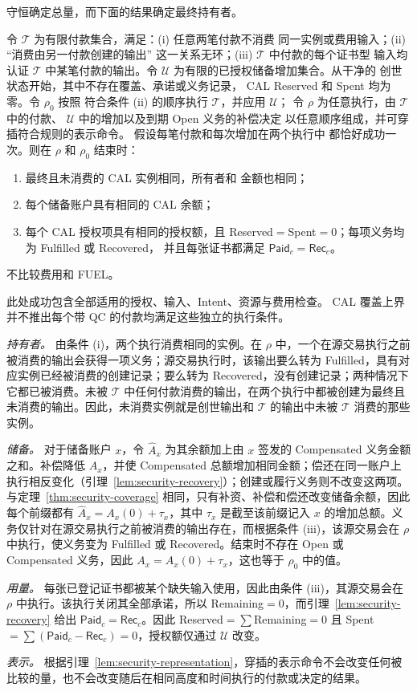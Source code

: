 守恒确定总量，而下面的结果确定最终持有者。

\begin{theorem}
\label{thm:security-neutrality}
令 $\mathcal T$ 为有限付款集合，满足：(i) 任意两笔付款不消费
同一实例或费用输入；(ii) ``消费由另一付款创建的输出''
这一关系无环；(iii) $\mathcal T$ 中付款的每个证书型
输入均认证 $\mathcal T$ 中某笔付款的输出。令
$\mathcal U$ 为有限的已授权储备增加集合。从干净的
创世状态开始，其中不存在覆盖、承诺或义务记录，
CAL Reserved 和 Spent 均为零。令 $\rho_0$ 按照
符合条件 (ii) 的顺序执行 $\mathcal T$，并应用 $\mathcal U$；
令 $\rho$ 为任意执行，由 $\mathcal T$ 中的付款、
$\mathcal U$ 中的增加以及到期 Open 义务的补偿决定
以任意顺序组成，并可穿插符合规则的表示命令。
假设每笔付款和每次增加在两个执行中
都恰好成功一次。则在 $\rho$ 和 $\rho_0$ 结束时：
\begin{enumerate}
\item 最终且未消费的 CAL 实例相同，所有者和
金额也相同；
\item 每个储备账户具有相同的 CAL 余额；
\item 每个 CAL 授权项具有相同的授权额，且
Reserved$=$Spent$=0$；每项义务均为 Fulfilled 或 Recovered，
并且每张证书都满足 $\mathsf{Paid}_c=\mathsf{Rec}_c$。
\end{enumerate}
不比较费用和 FUEL。
\end{theorem}
此处成功包含全部适用的授权、输入、Intent、资源与费用检查。
CAL 覆盖上界并不推出每个带 QC 的付款均满足这些独立的执行条件。
\begin{IEEEproof}
\emph{持有者。} 由条件 (i)，两个执行消费相同的实例。在 $\rho$ 中，一个在源交易执行之前被消费的输出会获得一项义务；源交易执行时，该输出要么转为 Fulfilled，具有对应实例已经被消费的创建记录；要么转为 Recovered，没有创建记录；两种情况下它都已被消费。未被 $\mathcal T$ 中任何付款消费的输出，在两个执行中都被创建为最终且未消费的输出。因此，未消费实例就是创世输出和 $\mathcal T$ 的输出中未被 $\mathcal T$ 消费的那些实例。

\emph{储备。} 对于储备账户 $x$，令 $\hat A_x$ 为其余额加上由 $x$ 签发的 Compensated 义务金额之和。补偿降低 $A_x$，并使 Compensated 总额增加相同金额；偿还在同一账户上执行相反变化（引理~\ref{lem:security-recovery}）；创建或履行义务则不改变这两项。与定理~\ref{thm:security-coverage} 相同，只有补资、补偿和偿还改变储备余额，因此每个前缀都有 $\hat A_x=A_x(0)+\tau_x$，其中 $\tau_x$ 是截至该前缀记入 $x$ 的增加总额。义务仅针对在源交易执行之前被消费的输出存在，而根据条件 (iii)，该源交易会在 $\rho$ 中执行，使义务变为 Fulfilled 或 Recovered。结束时不存在 Open 或 Compensated 义务，因此 $A_x=A_x(0)+\tau_x$，这也等于 $\rho_0$ 中的值。

\emph{用量。} 每张已登记证书都被某个缺失输入使用，因此由条件 (iii)，其源交易会在 $\rho$ 中执行。该执行关闭其全部承诺，所以 Remaining$=0$，而引理~\ref{lem:security-recovery} 给出 $\mathsf{Paid}_c=\mathsf{Rec}_c$。因此 Reserved$=\sum$Remaining$=0$ 且 Spent$=\sum(\mathsf{Paid}_c-\mathsf{Rec}_c)=0$，授权额仅通过 $\mathcal U$ 改变。

\emph{表示。} 根据引理~\ref{lem:security-representation}，穿插的表示命令不会改变任何被比较的量，也不会改变随后在相同高度和时间执行的付款或决定的结果。
\end{IEEEproof}

